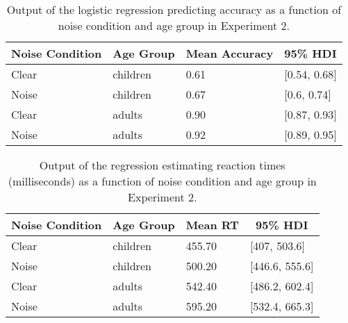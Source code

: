 \documentclass[,man,floatsintext]{apa6}
\begin{document}
\begin{appendix}
\begin{table}[h]
\begin{center}
\begin{threeparttable}
\caption{\label{tab:noise-acc-model}Output of the logistic regression predicting accuracy as a function of noise condition and age group in Experiment 2.}
\begin{tabular}{llll}
\toprule
Noise Condition & \multicolumn{1}{c}{Age Group} & \multicolumn{1}{c}{Mean Accuracy} & \multicolumn{1}{c}{95\% HDI}\\
\midrule
Clear & children & 0.61 & [0.54, 0.68]\\
Noise & children & 0.67 & [0.6, 0.74]\\
Clear & adults & 0.90 & [0.87, 0.93]\\
Noise & adults & 0.92 & [0.89, 0.95]\\
\bottomrule
\end{tabular}
\end{threeparttable}
\end{center}
\end{table}

\begin{table}[h]
\begin{center}
\begin{threeparttable}
\caption{\label{tab:noise-rt-model}Output of the regression estimating reaction times (milliseconds) as a function of noise condition and age group in Experiment 2.}
\begin{tabular}{llll}
\toprule
Noise Condition & \multicolumn{1}{c}{Age Group} & \multicolumn{1}{c}{Mean RT} & \multicolumn{1}{c}{95\% HDI}\\
\midrule
Clear & children & 455.70 & [407, 503.6]\\
Noise & children & 500.20 & [446.6, 555.6]\\
Clear & adults & 542.40 & [486.2, 602.4]\\
Noise & adults & 595.20 & [532.4, 665.3]\\
\bottomrule
\end{tabular}
\end{threeparttable}
\end{center}
\end{table}


\end{appendix}
\end{document}
